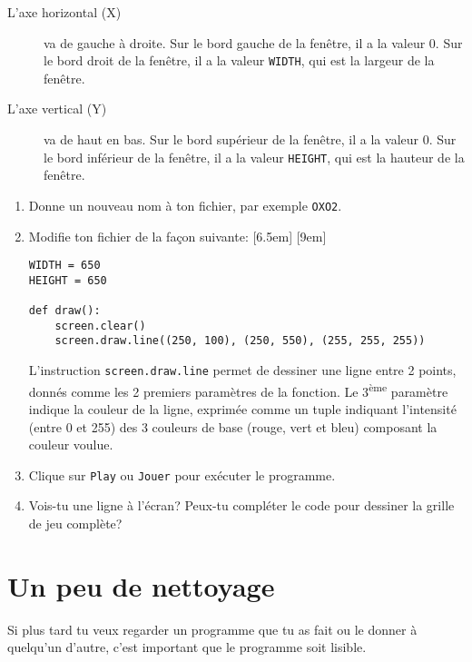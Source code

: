 \documentclass[11pt]{article}
\begin{document}
\begin{description}
    \item[L'axe horizontal (X)] va de gauche à droite.
    Sur le bord gauche de la fenêtre, il a la valeur 0.
    Sur le bord droit de la fenêtre, il a la valeur \lstinline{WIDTH},
    qui est la largeur de la fenêtre.
    
    \item[L'axe vertical (Y)] va de haut en bas.
    Sur le bord supérieur de la fenêtre, il a la valeur 0.
    Sur le bord inférieur de la fenêtre, il a la valeur \lstinline{HEIGHT},
    qui est la hauteur de la fenêtre.
\end{description}

\begin{enumerate}
    \item Donne un nouveau nom à ton fichier, par exemple \texttt{OXO2}.
    \item Modifie ton fichier de la façon suivante:
    \marginnote{\textcolor{deepblue}{clear~=~effacer}}[6.5em]
    \marginnote{\textcolor{deepblue}{draw~=~dessiner\\line~=ligne}}[9em]
\begin{lstlisting}
WIDTH = 650
HEIGHT = 650

def draw():
    screen.clear()
    screen.draw.line((250, 100), (250, 550), (255, 255, 255))
\end{lstlisting}

L'instruction \lstinline{screen.draw.line} permet de dessiner une ligne entre 2 points, donnés comme les 2 premiers paramètres de la fonction. Le 3\textsuperscript{ème} paramètre indique la couleur de la ligne, exprimée comme un tuple indiquant l'intensité (entre 0 et 255) des 3 couleurs de base (rouge, vert et bleu) composant la couleur voulue. 

    \item Clique sur \texttt{Play} ou \texttt{Jouer} pour exécuter le programme.

    \item Vois-tu une ligne à l'écran?
    Peux-tu compléter le code pour dessiner la grille de jeu complète?
\end{enumerate}

\section{Un peu de nettoyage}

Si plus tard tu veux regarder un programme que tu as fait ou le donner à quelqu'un d'autre, c'est important que le programme soit lisible.
\end{document}
